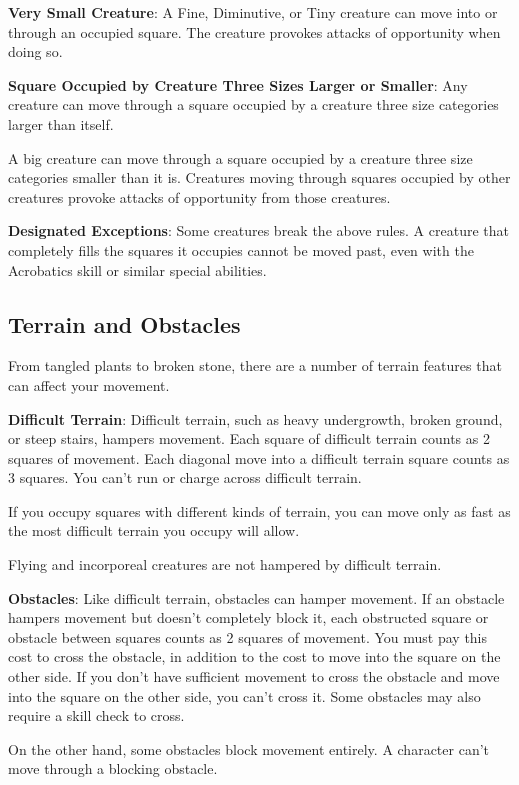 \textbf{Very Small Creature}: A Fine, Diminutive, or Tiny creature can move into or through an occupied square. The creature provokes attacks of opportunity when doing so.
				
\textbf{Square Occupied by Creature Three Sizes Larger or Smaller}: Any creature can move through a square occupied by a creature three size categories larger than itself.
				
A big creature can move through a square occupied by a creature three size categories smaller than it is. Creatures moving through squares occupied by other creatures provoke attacks of opportunity from those creatures.
				
\textbf{Designated Exceptions}: Some creatures break the above rules. A creature that completely fills the squares it occupies cannot be moved past, even with the Acrobatics skill or similar special abilities.
				
\subsection{Terrain and Obstacles}

				
From tangled plants to broken stone, there are a number of terrain features that can affect your movement.
				
\textbf{Difficult Terrain}: Difficult terrain, such as heavy undergrowth, broken ground, or steep stairs, hampers movement. Each square of difficult terrain counts as 2 squares of movement. Each diagonal move into a difficult terrain square counts as 3 squares. You can't run or charge across difficult terrain.
				
If you occupy squares with different kinds of terrain, you can move only as fast as the most difficult terrain you occupy will allow.
				
Flying and incorporeal creatures are not hampered by difficult terrain.
				
\textbf{Obstacles}: Like difficult terrain, obstacles can hamper movement. If an obstacle hampers movement but doesn't completely block it, each obstructed square or obstacle between squares counts as 2 squares of movement. You must pay this cost to cross the obstacle, in addition to the cost to move into the square on the other side. If you don't have sufficient movement to cross the obstacle and move into the square on the other side, you can't cross it. Some obstacles may also require a skill check to cross.
				
On the other hand, some obstacles block movement entirely. A character can't move through a blocking obstacle.
				
